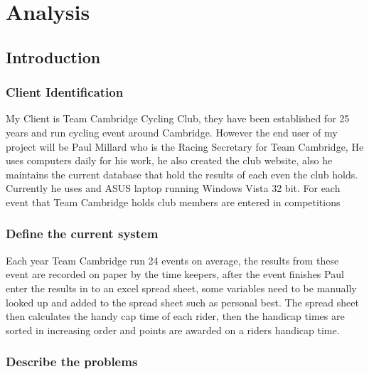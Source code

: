\chapter{Analysis}

\section{Introduction}

\subsection{Client Identification}
My Client is Team Cambridge Cycling Club, they have been established for 25 years and run cycling event around Cambridge. However the end user of my project will be Paul Millard who is the Racing Secretary for Team Cambridge, He uses computers daily for his work, he also created the club website, also he maintains the current database that hold the results of each even the club holds. Currently he uses and ASUS laptop running Windows Vista 32 bit. For each event that Team Cambridge holds club members are entered in competitions 
\subsection{Define the current system}
Each year Team Cambridge run 24 events on average, the results from these event are recorded on paper by the time keepers, after the event finishes Paul enter the results in to an excel spread sheet, some variables need to be manually looked up and added to the spread sheet such as personal best. The spread sheet then calculates the handy cap time of each rider, then the handicap times are sorted in increasing order and points are awarded on a riders handicap time.
\subsection{Describe the problems}

